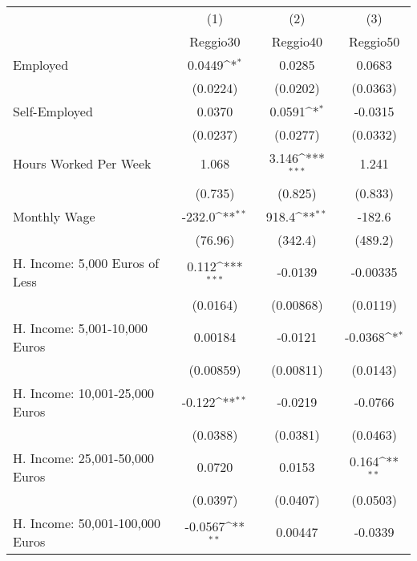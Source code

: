 {
\def\sym#1{\ifmmode^{#1}\else\(^{#1}\)\fi}
\begin{tabular}{l*{3}{c}}
\hline\hline
            &\multicolumn{1}{c}{(1)}&\multicolumn{1}{c}{(2)}&\multicolumn{1}{c}{(3)}\\
            &\multicolumn{1}{c}{Reggio30}&\multicolumn{1}{c}{Reggio40}&\multicolumn{1}{c}{Reggio50}\\
\hline
Employed    &      0.0449\sym{*}  &      0.0285         &      0.0683         \\
            &    (0.0224)         &    (0.0202)         &    (0.0363)         \\
[1em]
Self-Employed&      0.0370         &      0.0591\sym{*}  &     -0.0315         \\
            &    (0.0237)         &    (0.0277)         &    (0.0332)         \\
[1em]
Hours Worked Per Week&       1.068         &       3.146\sym{***}&       1.241         \\
            &     (0.735)         &     (0.825)         &     (0.833)         \\
[1em]
Monthly Wage&      -232.0\sym{**} &       918.4\sym{**} &      -182.6         \\
            &     (76.96)         &     (342.4)         &     (489.2)         \\
[1em]
H. Income: 5,000 Euros of Less&       0.112\sym{***}&     -0.0139         &    -0.00335         \\
            &    (0.0164)         &   (0.00868)         &    (0.0119)         \\
[1em]
H. Income: 5,001-10,000 Euros&     0.00184         &     -0.0121         &     -0.0368\sym{*}  \\
            &   (0.00859)         &   (0.00811)         &    (0.0143)         \\
[1em]
H. Income: 10,001-25,000 Euros&      -0.122\sym{**} &     -0.0219         &     -0.0766         \\
            &    (0.0388)         &    (0.0381)         &    (0.0463)         \\
[1em]
H. Income: 25,001-50,000 Euros&      0.0720         &      0.0153         &       0.164\sym{**} \\
            &    (0.0397)         &    (0.0407)         &    (0.0503)         \\
[1em]
H. Income: 50,001-100,000 Euros&     -0.0567\sym{**} &     0.00447         &     -0.0339         \\

\end{tabular}}

